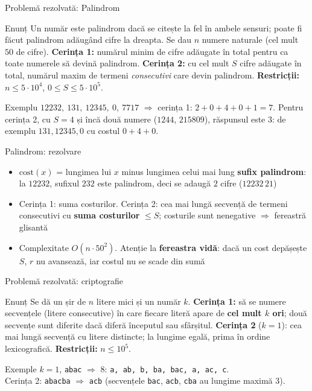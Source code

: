 \documentclass[8pt,mathserif]{beamer}
\begin{document}
\begin{frame}{Problemă rezolvată: Palindrom }
  \large
  \begin{exampleblock}{Enunț}
    Un număr este palindrom dacă se citește la fel în ambele sensuri; poate fi făcut palindrom adăugând cifre la dreapta. Se dau $n$ numere naturale (cel mult $50$ de cifre). \textbf{Cerința 1:} numărul minim de cifre adăugate în total pentru ca toate numerele să devină palindrom. \textbf{Cerința 2:} cu cel mult $S$ cifre adăugate în total, numărul maxim de termeni \emph{consecutivi} care devin palindrom. \textbf{Restricții:} $n \le 5 \cdot 10^4$, $0 \le S \le 5 \cdot 10^5$.
  \end{exampleblock}
  \begin{block}{Exemplu}
    $12232,\ 131,\ 12345,\ 0,\ 7717$ $\Longrightarrow$ cerința 1: $2 + 0 + 4 + 0 + 1 = 7$. Pentru cerința 2, cu $S = 4$ și încă două numere ($1244$, $215809$), răspunsul este $3$: de exemplu $131, 12345, 0$ cu costul $0 + 4 + 0$.
  \end{block}
\end{frame}

\begin{frame}{Palindrom: rezolvare}
  \large
  \begin{itemize}
    \item $\mathrm{cost}(x)$ = lungimea lui $x$ minus lungimea celui mai lung \textbf{sufix palindrom}: la $12232$, sufixul $232$ este palindrom, deci se adaugă $2$ cifre ($12232\,21$)
    \item Cerința 1: suma costurilor. Cerința 2: cea mai lungă secvență de termeni consecutivi cu \textbf{suma costurilor} $\le S$; costurile sunt nenegative $\Rightarrow$ fereastră glisantă
    \item Complexitate $O(n \cdot 50^2)$. Atenție la \textbf{fereastra vidă}: dacă un cost depășește $S$, $r$ nu avansează, iar costul nu se scade din sumă
  \end{itemize}
\end{frame}

\begin{frame}{Problemă rezolvată: criptografie }
  \large
  \begin{exampleblock}{Enunț}
    Se dă un șir de $n$ litere mici și un număr $k$. \textbf{Cerința 1:} să se numere secvențele (litere consecutive) în care fiecare literă apare de \textbf{cel mult $k$ ori}; două secvențe sunt diferite dacă diferă începutul sau sfârșitul. \textbf{Cerința 2} ($k = 1$): cea mai lungă secvență cu litere distincte; la lungime egală, prima în ordine lexicografică. \textbf{Restricții:} $n \le 10^5$.
  \end{exampleblock}
  \begin{block}{Exemple}
    $k = 1$, \texttt{abac} $\Longrightarrow$ $8$: \texttt{a, ab, b, ba, bac, a, ac, c}.\\
    Cerința 2: \texttt{abacba} $\Longrightarrow$ \texttt{acb} (secvențele \texttt{bac}, \texttt{acb}, \texttt{cba} au lungime maximă $3$).
  \end{block}
\end{frame}
\end{document}
